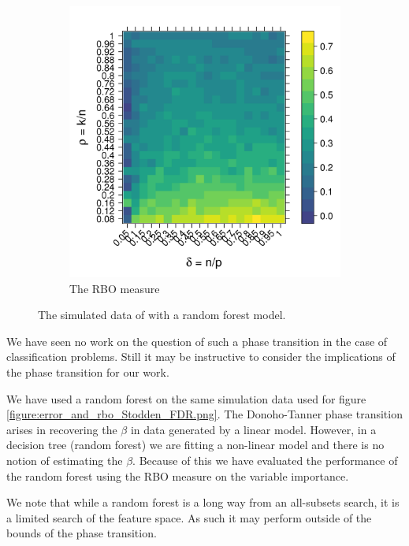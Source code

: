 \documentclass[10pt,letterpaper]{article}
\begin{document}
\begin{figure}[tbhp]
\begin{subfigure}[t]{0.5\linewidth}
       \includegraphics[totalheight=6cm]{./figs/ranger_rbo_Stodden_simulation.png}
       \caption{The RBO measure}
       \label{figure:ranger_rbo_Stodden_simulation.png}
     \end{subfigure} 
     \caption{The simulated data of  with a random forest model.}
     \label{figure:ranger_error_and_rbo_Stodden_simulation.png}
 \end{figure}


We have seen no work on the question of such a phase transition in the case of classification problems. Still it may be
instructive to consider the implications of the phase transition for our work. 

We have used a random forest on the same simulation data used for figure \ref{figure:error_and_rbo_Stodden_FDR.png}.  The
Donoho-Tanner phase transition arises in recovering the $\beta$ in data generated by a linear model. However, in a
decision tree (random forest) we are fitting a non-linear model and there is no notion of estimating the
$\beta$. Because of this we have evaluated the performance of the random forest using the RBO measure on the variable
importance.

We note that while a random forest is a long way from an all-subsets search, it is a limited search of
the feature space. As such it may perform outside of the bounds of the phase transition. 
\end{document}
